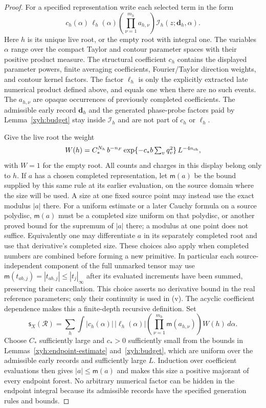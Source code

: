 \begin{proof}
For a specified representation write each selected term in the form
\[
 c_h(\alpha)\,\ell_h(\alpha)
       \left(\prod_{\nu=1}^{m_h}a_{h,\nu}\right)
       \mathcal I_h(z;\mathbf d_h,\alpha).
\]
Here $h$ is its unique live root, or the empty root with integral one.
The variables $\alpha$ range over the compact Taylor and contour
parameter spaces with their positive product measure. The structural
coefficient $c_h$ contains the displayed parameter powers, finite
averaging coefficients, Fourier/Taylor direction weights, and contour
kernel factors. The factor $\ell_h$ is only the explicitly extracted
late numerical product defined above, and equals one when there are no
such events. The $a_{h,\nu}$ are opaque occurrences of previously
completed coefficients. The admissible early record $\mathbf d_h$ and
the generated phase-probe factors paid by Lemma~\ref{xyh:budget} stay
inside $\mathcal I_h$ and are not part of $c_h$ or $\ell_h$.

Give the live root the weight
\begin{equation}\label{xyh:representation-weight}
 W(h)=C_*^{N_h}\,b^{-n_F}
 \exp\{-c_*b\textstyle\sum_vq_v^2\}\,L^{-4n_{\rm ch}},
\end{equation}
with $W=1$ for the empty root. All counts and charges in this display
belong only to $h$. If $a$ has a chosen completed representation, let
$\mathsf m(a)$ be the bound supplied by this same rule at its earlier
evaluation, on the source domain where the size will be used. A size at
one fixed source point may instead use the exact modulus $|a|$ there.
For a uniform estimate or a later Cauchy formula on a source polydisc,
$\mathsf m(a)$ must be a completed size uniform on that polydisc, or
another proved bound for the supremum of $|a|$ there; a modulus at one
point does not suffice. Equivalently one may differentiate $a$ in its
separately completed root and use that derivative's completed size.
These choices also apply when completed numbers are combined before
forming a new primitive. In particular each source-independent component
of the full unmarked tensor may use
$\mathsf m(t_{ab,j})=|t_{ab,j}|\le |t_j|_\infty$ after its evaluated
increments have been summed, preserving their cancellation. This choice
asserts no derivative bound in the real reference parameters; only their
continuity is used in (v). The acyclic coefficient dependence makes this
a finite-depth recursive definition. Set
\[
 \mathsf s_X(\mathcal R)=\sum_h\int
     |c_h(\alpha)|\,|\ell_h(\alpha)|
     \left(\prod_{\nu=1}^{m_h}\mathsf m(a_{h,\nu})\right)
     W(h)\,d\alpha.
\]
Choose $C_*$ sufficiently large and $c_*>0$ sufficiently small from the
bounds in Lemmas~\ref{xyh:endpoint-estimate} and~\ref{xyh:budget}, which
are uniform over the admissible early records and sufficiently large
$L$. Induction over coefficient evaluations then gives
$|a|\le\mathsf m(a)$ and makes this size a positive majorant of every
endpoint forest. No arbitrary numerical factor can be hidden in the
endpoint integral because its admissible records have the specified
generation rules and bounds.


\end{proof}
